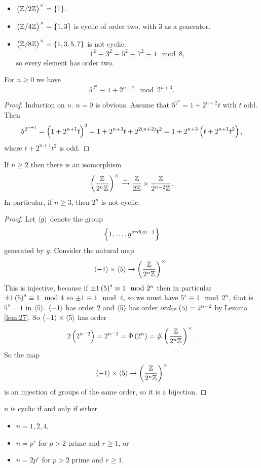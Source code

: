 \begin{example*}
\hfill
\begin{itemize}
\item $ \unit{2} = \cbr{1} $.
\item $ \unit{4} = \cbr{1, 3} $ is cyclic of order two, with $ 3 $ as a generator.
\item $ \unit{8} = \cbr{1, 3, 5, 7} $ is not cyclic.
$$ 1^2 \equiv 3^2 \equiv 5^2 \equiv 7^2 \equiv 1 \mod 8, $$
so every element has order two.
\end{itemize}
\end{example*}

\pagebreak

\begin{lemma}
\label{lem:27}
For $ n \ge 0 $ we have
$$ 5^{2^n} \equiv 1 + 2^{n + 2} \mod 2^{n + 3}. $$
\end{lemma}

\begin{proof}
Induction on $ n $. $ n = 0 $ is obvious. Assume that $ 5^{2^n} = 1 + 2^{n + 2}t $ with $ t $ odd. Then
$$ 5^{2^{n + 1}} = \br{1 + 2^{n + 1}t}^2 = 1 + 2^{n + 3}t + 2^{2\br{n + 2}}t^2 = 1 + 2^{n + 3}\br{t + 2^{n + 1}t^2}, $$
where $ t + 2^{n + 1}t^2 $ is odd.
\end{proof}

\begin{proposition}
If $ n \ge 2 $ then there is an isomorphism
$$ \Unit{2^n} \xrightarrow{\sim} \dfrac{\Z}{2\Z} \times \dfrac{\Z}{2^{n - 2}\Z}. $$
In particular, if $ n \ge 3 $, then $ \unit{2^n} $ is not cyclic.
\end{proposition}

\begin{proof}
Let $ \left\langle g \right\rangle $ denote the group
$$ \cbr{1, \dots, g^{ord\br{g} - 1}} $$
generated by $ g $. Consider the natural map
$$ \abr{-1} \times \abr{5} \to \Unit{2^n}. $$
This is injective, because if $ \pm 1\br{5}^s \equiv 1 \mod 2^n $ then in particular $ \pm 1\br{5}^s \equiv 1 \mod 4 $ so $ \pm 1 \equiv 1 \mod 4 $, so we must have $ 5^s \equiv 1 \mod 2^n $, that is $ 5^s = 1 $ in $ \left\langle 5 \right\rangle $. $ \left\langle -1 \right\rangle $ has order $ 2 $ and $ \left\langle 5 \right\rangle $ has order $ ord_{2^n}\br{5} = 2^{n - 2} $ by Lemma \ref{lem:27}. So $ \left\langle -1 \right\rangle \times \left\langle 5 \right\rangle $ has order
$$ 2\br{2^{n - 2}} = 2^{n - 1} = \Phi\br{2^n} = \#\Unit{2^n}. $$
So the map
$$ \abr{-1} \times \abr{5} \to \Unit{2^n} $$
is an injection of groups of the same order, so it is a bijection.
\end{proof}

\begin{theorem}
$ \unit{n} $ is cyclic if and only if either
\begin{itemize}
\item $ n = 1, 2, 4 $,
\item $ n = p^r $ for $ p > 2 $ prime and $ r \ge 1 $, or
\item $ n = 2p^r $ for $ p > 2 $ prime and $ r \ge 1 $.
\end{itemize}
\end{theorem}

